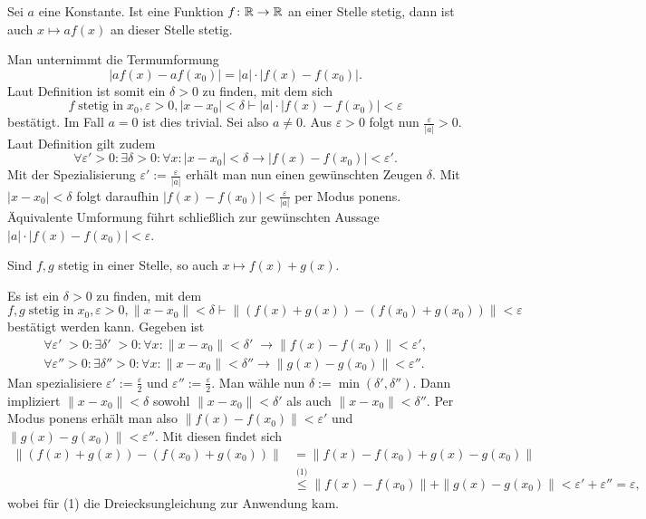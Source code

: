 \begin{Satz}
Sei $a$ eine Konstante. Ist eine Funktion $f\colon\mathbb R\to\mathbb R$ an einer
Stelle stetig, dann ist auch $x\mapsto af(x)$ an dieser Stelle stetig.
\end{Satz}
\begin{Beweis}
Man unternimmt die Termumformung
\[|af(x)-af(x_0)| = |a|\cdot |f(x)-f(x_0)|.\]
Laut Definition ist somit ein $\delta>0$ zu finden, mit dem sich
\[f\;\text{stetig in}\;x_0,\varepsilon>0,|x-x_0|<\delta\vdash |a|\cdot |f(x)-f(x_0)|<\varepsilon\]
bestätigt. Im Fall $a=0$ ist dies trivial. Sei also $a\ne 0$.
Aus $\varepsilon>0$ folgt nun $\tfrac{\varepsilon}{|a|}>0$. Laut Definition gilt zudem
\[\forall\varepsilon'>0\colon\exists\delta>0\colon\forall x\colon |x-x_0|<\delta\to |f(x)-f(x_0)|<\varepsilon'.\]
Mit der Spezialisierung $\varepsilon':=\tfrac{\varepsilon}{|a|}$ erhält
man nun einen gewünschten Zeugen $\delta$. Mit $|x-x_0|<\delta$ folgt
daraufhin $|f(x)-f(x_0)|<\tfrac{\varepsilon}{|a|}$ per Modus ponens.
Äquivalente Umformung führt schließlich zur gewünschten Aussage
$|a|\cdot |f(x)-f(x_0)|<\varepsilon$.\,\qedsymbol
\end{Beweis}

\begin{Satz}
Sind $f,g$ stetig in einer Stelle, so auch $x\mapsto f(x)+g(x)$.
\end{Satz}
\begin{Beweis}
Es ist ein $\delta>0$ zu finden, mit dem
\[f,g\;\text{stetig in}\;x_0,\varepsilon>0,\|x-x_0\|<\delta\vdash
\|(f(x)+g(x))-(f(x_0)+g(x_0))\|<\varepsilon\]
bestätigt werden kann. Gegeben ist
\begin{gather*}
\forall\varepsilon'\;>0\colon\exists\delta'\;>0\colon\forall x\colon
  \|x-x_0\|<\delta'\;\to \|f(x)-f(x_0)\|<\varepsilon',\\
\forall\varepsilon''>0\colon\exists\delta''>0\colon\forall x\colon
  \|x-x_0\|<\delta''\to \|g(x)-g(x_0)\|<\varepsilon''.
\end{gather*}
Man spezialisiere $\varepsilon':=\frac{\varepsilon}{2}$ und
$\varepsilon'':=\frac{\varepsilon}{2}$. Man wähle nun
$\delta:=\min(\delta',\delta'')$. Dann impliziert $\|x-x_0\|<\delta$
sowohl $\|x-x_0\|<\delta'$ als auch $\|x-x_0\|<\delta''$. Per Modus ponens
erhält man also $\|f(x)-f(x_0)\|<\varepsilon'$ und $\|g(x)-g(x_0)\|<\varepsilon''$.
Mit diesen findet sich
\begin{align*}
\|(f(x)+g(x))-(f(x_0)+g(x_0))\| &= \|f(x)-f(x_0)+g(x)-g(x_0)\|\\
&\stackrel{\text{(1)}}\le \|f(x)-f(x_0)\|+\|g(x)-g(x_0)\|
< \varepsilon'+\varepsilon'' = \varepsilon,
\end{align*}
wobei für (1) die Dreiecksungleichung zur Anwendung kam.\,\qedsymbol
\end{Beweis}

